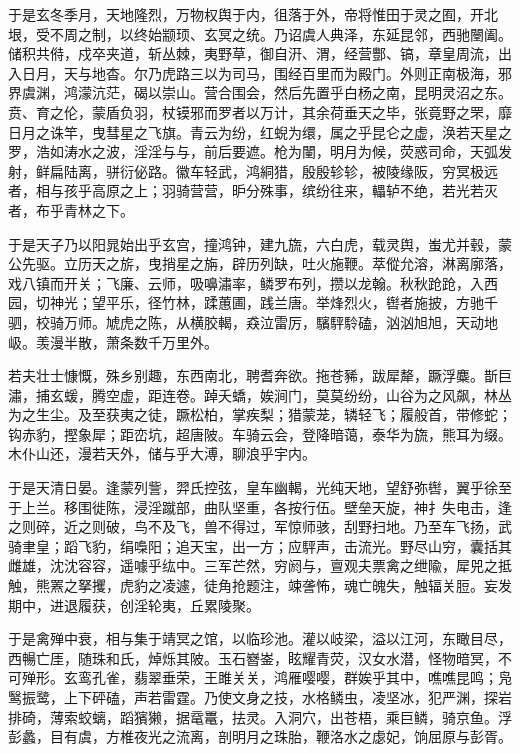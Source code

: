 \documentclass[12pt,UTF8]{ctexbook}
\begin{document}
于是玄冬季月，天地隆烈，万物权舆于内，徂落于外，帝将惟田于灵之囿，开北垠，受不周之制，以终始颛顼、玄冥之统。乃诏虞人典泽，东延昆邻，西驰闛阖。储积共偫，戍卒夹道，斩丛棘，夷野草，御自汧、渭，经营酆、镐，章皇周流，出入日月，天与地杳。尔乃虎路三以为司马，围经百里而为殿门。外则正南极海，邪界虞渊，鸿濛沆茫，碣以崇山。营合围会，然后先置乎白杨之南，昆明灵沼之东。贲、育之伦，蒙盾负羽，杖镆邪而罗者以万计，其余荷垂天之毕，张竟野之罘，靡日月之诛竿，曳彗星之飞旗。青云为纷，红蜺为缳，属之乎昆仑之虚，涣若天星之罗，浩如涛水之波，淫淫与与，前后要遮。枪为闉，明月为候，荧惑司命，天弧发射，鲜扁陆离，骈衍佖路。徽车轻武，鸿絧猎，殷殷轸轸，被陵缘阪，穷冥极远者，相与孩乎高原之上；羽骑营营，昈分殊事，缤纷往来，轠轳不绝，若光若灭者，布乎青林之下。



于是天子乃以阳晁始出乎玄宫，撞鸿钟，建九旒，六白虎，载灵舆，蚩尤并毂，蒙公先驱。立历天之旂，曳捎星之旃，辟历列缺，吐火施鞭。萃傱允溶，淋离廓落，戏八镇而开关；飞廉、云师，吸嚊潚率，鳞罗布列，攒以龙翰。秋秋跄跄，入西园，切神光；望平乐，径竹林，蹂蕙圃，践兰唐。举烽烈火，辔者施披，方驰千驷，校骑万师。虓虎之陈，从横胶輵，猋泣雷厉，驞駍駖磕，汹汹旭旭，天动地岋。羡漫半散，萧条数千万里外。



若夫壮士慷慨，殊乡别趣，东西南北，聘耆奔欲。拖苍豨，跋犀犛，蹶浮麋。斮巨潚，捕玄蝯，腾空虚，距连卷。踔夭蟜，娭涧门，莫莫纷纷，山谷为之风飙，林丛为之生尘。及至获夷之徒，蹶松柏，掌疾梨；猎蒙茏，辚轻飞；履般首，带修蛇；钩赤豹，摼象犀；距峦坑，超唐陂。车骑云会，登降暗蔼，泰华为旒，熊耳为缀。木仆山还，漫若天外，储与乎大溥，聊浪乎宇内。



于是天清日晏。逢蒙列訾，羿氏控弦，皇车幽輵，光纯天地，望舒弥辔，翼乎徐至于上兰。移围徙陈，浸淫蹴部，曲队坚重，各按行伍。壁垒天旋，神扌失电击，逢之则碎，近之则破，鸟不及飞，兽不得过，军惊师骇，刮野扫地。乃至车飞扬，武骑聿皇；蹈飞豹，绢嘄阳；追天宝，出一方；应駍声，击流光。野尽山穷，囊括其雌雄，沈沈容容，遥噱乎纮中。三军芒然，穷阏与，亶观夫票禽之绁隃，犀兕之抵触，熊罴之拏攫，虎豹之凌遽，徒角抢题注，竦詟怖，魂亡魄失，触辐关脰。妄发期中，进退履获，创淫轮夷，丘累陵聚。



于是禽殚中衰，相与集于靖冥之馆，以临珍池。灌以岐梁，溢以江河，东瞰目尽，西暢亡厓，随珠和氏，焯烁其陂。玉石嶜崟，眩耀青荧，汉女水潜，怪物暗冥，不可殚形。玄鸾孔雀，翡翠垂荣，王雎关关，鸿雁嘤嘤，群娭乎其中，噍噍昆鸣；凫鹥振鹭，上下砰磕，声若雷霆。乃使文身之技，水格鳞虫，凌坚冰，犯严渊，探岩排碕，薄索蛟螭，蹈獱獭，据鼋鼍，抾灵。入洞穴，出苍梧，乘巨鳞，骑京鱼。浮彭蠡，目有虞，方椎夜光之流离，剖明月之珠胎，鞭洛水之虙妃，饷屈原与彭胥。
\end{document}
